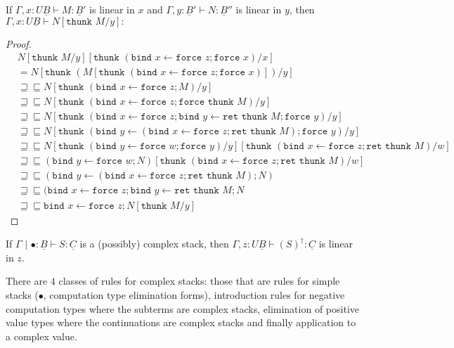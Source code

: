 \documentclass[acmsmall,screen,12pt]{acmart}
\renewcommand{\u}{\underline}
\newcommand{\pipe}{\,\,|\,\,}
\newcommand{\ltdyn}{\sqsubseteq}
\newcommand{\gtdyn}{\sqsupseteq}
\newcommand{\equidyn}{\mathrel{\gtdyn\ltdyn}}
\newcommand{\simp}[1]{{#1}^{\dag}}
\newcommand{\simpp}[1]{\simp{({#1})}}
\newcommand{\bindXtoYinZ}[2]{\kw{bind}#2 \leftarrow #1;}
\newcommand{\kw}[1]{\texttt{#1}\,\,}
\newcommand{\ret}{\kw{ret}}
\newcommand{\thunk}{\kw{thunk}}
\newcommand{\force}{\kw{force}}
\begin{document}
{\begin{longonly}
\begin{lemma}
  If $\Gamma , x : U \u B \vdash M : \u B'$ is linear in $x$ and
  $\Gamma , y : \u B' \vdash N : \u B''$ is linear in $y$, then
  $\Gamma , x : U \u B \vdash N[\thunk M/y] : $
\end{lemma}
\begin{proof}
  \begin{align*}
    &N[\thunk M/y][\thunk{(\bindXtoYinZ {\force z} x \force x)}/x]\\
    &= N[\thunk {(M[\thunk{(\bindXtoYinZ {\force z} x \force x)}])}/y]\\
    &\equidyn N[\thunk {(\bindXtoYinZ {\force z} x M)}/y]\tag{$M$ linear}\\
    &\equidyn N[\thunk{(\bindXtoYinZ {\force z} x \force \thunk M)}/y] \tag{$U\beta$}\\
    &\equidyn
    N[\thunk{(\bindXtoYinZ {\force z} x \bindXtoYinZ {\ret\thunk M} y \force y)}/y] \tag{$\u F\beta$}\\
    &\equidyn
    N[\thunk{(\bindXtoYinZ {(\bindXtoYinZ {\force z} x \ret\thunk M)} y \force y)}/y] \tag{$\u F\eta$}\\
    &\equidyn
    N[\thunk{(\bindXtoYinZ {\force w} y \force y)}/y][\thunk(\bindXtoYinZ {\force z} x \ret\thunk M)/w] \tag{$U\beta$}\\
    &\equidyn (\bindXtoYinZ {\force w} y N)[\thunk (\bindXtoYinZ {\force z} x \ret \thunk M)/w] \tag{$N$ linear}\\
    &\equidyn (\bindXtoYinZ {(\bindXtoYinZ {\force z} x \ret \thunk M)} y N) \tag{$U\beta$}\\
    &\equidyn (\bindXtoYinZ {\force z} x \bindXtoYinZ {\ret\thunk M} y N \tag{$\u F\eta$}\\
    &\equidyn \bindXtoYinZ {\force z} x N[\thunk M/y]
  \end{align*}
\end{proof}

\begin{lemma}
  If $\Gamma\pipe \bullet : \u B \vdash S : \u C$ is a (possibly)
  complex stack, then $\Gamma, z : U\u B \vdash \simpp{S} : \u C$ is linear in $z$.
\end{lemma}
\begin{longproof}
  There are $4$ classes of rules for complex stacks: those that are
  rules for simple stacks ($\bullet$, computation type elimination
  forms), introduction rules for negative computation types where the
  subterms are complex stacks, elimination of positive value types
  where the continuations are complex stacks and finally application
  to a complex value.


\end{longproof}
\end{longonly}}
\end{document}
